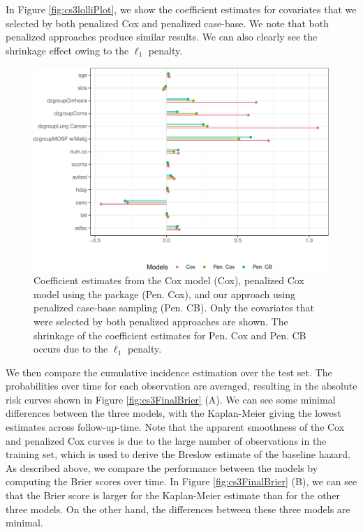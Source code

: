 In Figure \ref{fig:cs3lolliPlot}, we show the coefficient estimates for
covariates that we selected by both penalized Cox and penalized
case-base. We note that both penalized approaches produce similar
results. We can also clearly see the shrinkage effect owing to the
\(\ell_1\) penalty.

\begin{Schunk}
\begin{figure}[ht]
\includegraphics[width=\textwidth,keepaspectratio=true]{../figures/coefplots-1} \caption{\label{fig:cs3lolliPlot} Coefficient estimates from the Cox model (Cox), penalized Cox model using the  package (Pen. Cox), and our approach using penalized case-base sampling (Pen. CB). Only the covariates that were selected by both penalized approaches are shown. The shrinkage of the coefficient estimates for Pen. Cox and Pen. CB occurs due to the $\ell_1$ penalty.}\label{fig:coefplots}
\end{figure}
\end{Schunk}

We then compare the cumulative incidence estimation over the test set.
The probabilities over time for each observation are averaged, resulting
in the absolute risk curves shown in Figure \ref{fig:cs3FinalBrier} (A).
We can see some minimal differences between the three models, with the
Kaplan-Meier giving the lowest estimates across follow-up-time. Note
that the apparent smoothness of the Cox and penalized Cox curves is due
to the large number of observations in the training set, which is used
to derive the Breslow estimate of the baseline hazard. As described
above, we compare the performance between the models by computing the
Brier scores over time. In Figure \ref{fig:cs3FinalBrier} (B), we can
see that the Brier score is larger for the Kaplan-Meier estimate than
for the other three models. On the other hand, the differences between
these three models are minimal.

